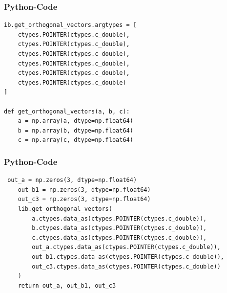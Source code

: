 \documentclass{beamer}
\begin{document}
\begin{frame}[fragile]
\frametitle{Python-Code}
\begin{lstlisting}
ib.get_orthogonal_vectors.argtypes = [
    ctypes.POINTER(ctypes.c_double),
    ctypes.POINTER(ctypes.c_double),
    ctypes.POINTER(ctypes.c_double),
    ctypes.POINTER(ctypes.c_double),
    ctypes.POINTER(ctypes.c_double),
    ctypes.POINTER(ctypes.c_double)
]

def get_orthogonal_vectors(a, b, c):
    a = np.array(a, dtype=np.float64)
    b = np.array(b, dtype=np.float64)
    c = np.array(c, dtype=np.float64)
\end{lstlisting}
\end{frame}
\begin{frame}[fragile]
\frametitle{Python-Code}
\begin{lstlisting}
 out_a = np.zeros(3, dtype=np.float64)
    out_b1 = np.zeros(3, dtype=np.float64)
    out_c3 = np.zeros(3, dtype=np.float64)
    lib.get_orthogonal_vectors(
        a.ctypes.data_as(ctypes.POINTER(ctypes.c_double)),
        b.ctypes.data_as(ctypes.POINTER(ctypes.c_double)),
        c.ctypes.data_as(ctypes.POINTER(ctypes.c_double)),
        out_a.ctypes.data_as(ctypes.POINTER(ctypes.c_double)),
        out_b1.ctypes.data_as(ctypes.POINTER(ctypes.c_double)),
        out_c3.ctypes.data_as(ctypes.POINTER(ctypes.c_double))
    )
    return out_a, out_b1, out_c3
\end{lstlisting}
\end{frame}
\end{document}
